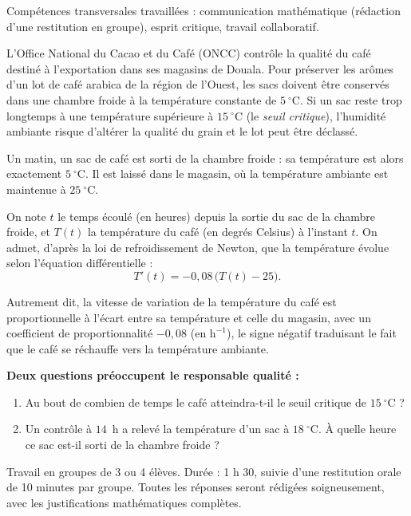 \documentclass[11pt]{article}
\newcounter{popsec}
\newcounter{popsub}
\newcommand{\courssub}[1]{%
  \stepcounter{popsub}%
  \par\vspace{9pt}\noindent{\popxbold\fontsize{11.5}{13}\selectfont\color{popink}{\color{poporange}\thepopsec.\thepopsub}\hspace{6pt}#1}\par\nopagebreak\vspace{4pt}
}
\begin{document}
Compétences transversales travaillées : communication mathématique (rédaction d'une restitution en groupe), esprit critique, travail collaboratif.

\courssub{Situation}

L'Office National du Cacao et du Café (ONCC) contrôle la qualité du café destiné à l'exportation dans ses magasins de Douala. Pour préserver les arômes d'un lot de café arabica de la région de l'Ouest, les sacs doivent être conservés dans une chambre froide à la température constante de $5~^\circ\mathrm{C}$. Si un sac reste trop longtemps à une température supérieure à $15~^\circ\mathrm{C}$ (le \emph{seuil critique}), l'humidité ambiante risque d'altérer la qualité du grain et le lot peut être déclassé.

Un matin, un sac de café est sorti de la chambre froide : sa température est alors exactement $5~^\circ\mathrm{C}$. Il est laissé dans le magasin, où la température ambiante est maintenue à $25~^\circ\mathrm{C}$.

On note $t$ le temps écoulé (en heures) depuis la sortie du sac de la chambre froide, et $T(t)$ la température du café (en degrés Celsius) à l'instant $t$. On admet, d'après la loi de refroidissement de Newton, que la température évolue selon l'équation différentielle :
\[ T'(t) = -0{,}08\,\big(T(t) - 25\big). \]

Autrement dit, la vitesse de variation de la température du café est proportionnelle à l'écart entre sa température et celle du magasin, avec un coefficient de proportionnalité $-0{,}08$ (en $\mathrm{h}^{-1}$), le signe négatif traduisant le fait que le café se réchauffe vers la température ambiante.

\textbf{Deux questions préoccupent le responsable qualité :}
\begin{enumerate}
\item Au bout de combien de temps le café atteindra-t-il le seuil critique de $15~^\circ\mathrm{C}$ ?
\item Un contrôle à $14$~h a relevé la température d'un sac à $18~^\circ\mathrm{C}$. À quelle heure ce sac est-il sorti de la chambre froide ?
\end{enumerate}

\courssub{Consignes}

Travail en groupes de 3 ou 4 élèves. Durée : 1 h 30, suivie d'une restitution orale de 10 minutes par groupe. Toutes les réponses seront rédigées soigneusement, avec les justifications mathématiques complètes.
\end{document}
